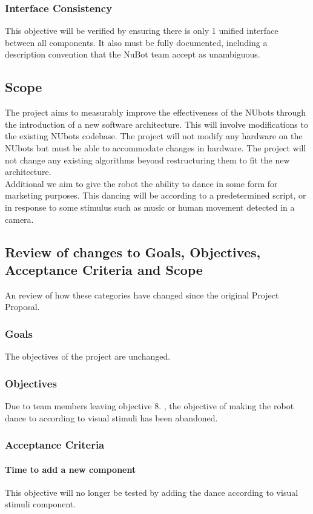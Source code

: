 \documentclass[english,12pt]{scrartcl}
\begin{document}
			\subsubsection{Interface Consistency}
				This objective will be verified by ensuring there is only 1 unified interface between all components. It also must be fully documented, including a description convention that the NuBot team accept as unambiguous.

		\subsection {Scope}
			The project aims to measurably improve the effectiveness of the NUbots through the introduction of a new software architecture. This will involve modifications to the existing NUbots codebase. The project will not modify any hardware on the NUbots but must be able to accommodate changes in hardware. The project will not change any existing algorithms beyond restructuring them to fit the new architecture.
			\\Additional we aim to give the robot the ability to dance in some form for marketing purposes. This dancing will be according to a predetermined script, or in response to some stimulus such as music or human movement detected in a camera.
				
		\subsection {Review of changes to Goals, Objectives, Acceptance Criteria and Scope}
			An review of how these categories have changed since the original Project Proposal.
			\subsubsection{Goals}
				The objectives of the project are unchanged.
			\subsubsection{Objectives}
				 Due to team members leaving objective 8. , the objective of making the robot dance to according to visual stimuli has been abandoned.
			\subsubsection{Acceptance Criteria}
				\paragraph{Time to add a new component}
					This objective will no longer be tested by adding the dance according to visual stimuli component.
\end{document}
